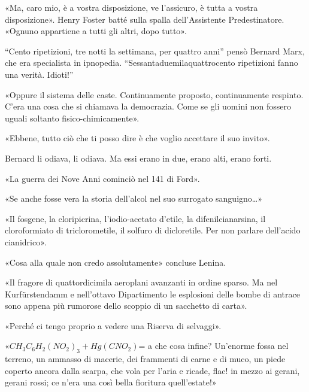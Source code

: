 \documentclass[
a5paper, %
10pt, %
twoside, 
onecolumn, %
openany, %
]{memoir}
\renewenvironment{shaded}{%
  \def\FrameCommand{\fboxsep=\FrameSep \colorbox{shadecolor}}%
  \MakeFramed{\advance\hsize-\width \FrameRestore\FrameRestore}}%
 {\endMakeFramed}
\begin{document}
\begin{shaded}
    «Ma, caro mio, è a vostra disposizione, ve l’assicuro, è tutta a vostra disposizione». Henry Foster batté sulla spalla dell’Assistente Predestinatore. «Ognuno appartiene a tutti gli altri, dopo tutto».

“Cento ripetizioni, tre notti la settimana, per quattro anni” pensò Bernard Marx, che era specialista in ipnopedia. “Sessantaduemilaquattrocento ripetizioni fanno una verità. Idioti!”
\end{shaded}

«Oppure il sistema delle caste. Continuamente proposto, continuamente respinto. C’era una cosa che si chiamava la democrazia. Come se gli uomini non fossero uguali soltanto fisico-chimicamente».

\begin{shaded}
    «Ebbene, tutto ciò che ti posso dire è che voglio accettare il suo invito».

Bernard li odiava, li odiava. Ma essi erano in due, erano alti, erano forti.
\end{shaded}

«La guerra dei Nove Anni cominciò nel 141 di Ford».

\begin{shaded}
    «Se anche fosse vera la storia dell’alcol nel suo surrogato sanguigno…»

«Il fosgene, la cloripicrina, l’iodio-acetato d’etile, la difenilcianarsina, il cloroformiato di triclorometile, il solfuro di dicloretile. Per non parlare dell’acido cianidrico».

«Cosa alla quale non credo assolutamente» concluse Lenina.
\end{shaded}

«Il fragore di quattordicimila aeroplani avanzanti in ordine sparso. Ma nel Kurfürstendamm e nell’ottavo Dipartimento le esplosioni delle bombe di antrace sono appena più rumorose dello scoppio di un sacchetto di carta».

\begin{shaded}
    «Perché ci tengo proprio a vedere una Riserva di selvaggi».
\end{shaded}

«$CH_3C_6H_2(NO_2)_3 + Hg(CNO_2)$= a che cosa infine? Un’enorme fossa nel terreno, un ammasso di macerie, dei frammenti di carne e di muco, un piede coperto ancora dalla scarpa, che vola per l’aria e ricade, flac! in mezzo ai gerani, gerani rossi; ce n’era una così bella fioritura quell’estate!»
\end{document}
